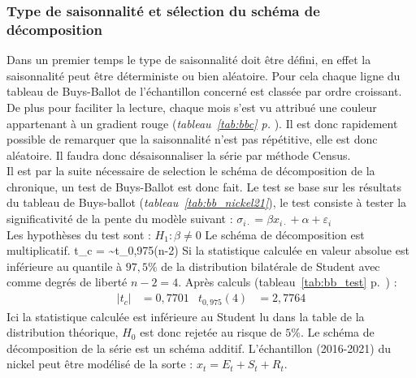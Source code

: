 \subsubsection{Type de saisonnalité et sélection du schéma de décomposition}
Dans un premier temps le type de saisonnalité doit être défini, en effet la saisonnalité peut être déterministe ou bien aléatoire. Pour cela chaque ligne du tableau de 
Buys-Ballot de l'échantillon concerné est classée par ordre croissant. De plus pour faciliter la lecture, chaque mois s'est vu attribué une couleur appartenant à
un gradient rouge (\textit{tableau~\ref{tab:bbc} p.\pageref{tab:bbc} }). Il est donc rapidement possible de remarquer que la saisonnalité n'est pas répétitive,
elle est donc aléatoire. Il faudra donc désaisonnaliser la série par méthode Census.\\[11pt] 
Il est par la suite nécessaire de selection le schéma de décomposition de la chronique, un test de Buys-Ballot est donc fait. Le test se base sur les résultats du tableau
de Buys-ballot (\textit{tableau~\ref{tab:bb_nickel21}}), le test consiste à tester la significativité de la pente du modèle suivant : 
$\sigma_{i\cdot} = \beta x_{i\cdot} + \alpha + \varepsilon_{i}$ \\[11pt]
Les hypothèses du test sont :
{$H_{1} : \beta \neq 0 $ Le schéma de décomposition est multiplicatif.}
{t_{c} = \frac{\hat{\beta}}{\hat{\sigma}_{\hat{\beta}}}\sim t_{0,975}(n-2)}
Si la statistique calculée en valeur absolue est inférieure au quantile à $97,5\%$ de la distribution bilatérale de Student avec comme degrés de liberté $ n-2 = 4$. 
Après calculs (tableau~\ref{tab:bb_test} p.~\pageref{tab:bb_test}) :
\begin{align*}
    |t_{c}| &= 0,7701  & t_{0,975}(4) &= 2,7764
\end{align*}
Ici la statistique calculée est inférieure au Student lu dans la table de la distribution théorique, $H_{0}$ est donc rejetée au risque de $5\%$. Le schéma de décomposition
de la série est un schéma additif. L'échantillon (2016-2021) du nickel peut être modélisé de la sorte : $ x_{t} = E_{t} + S_{t} + R_{t}$.

